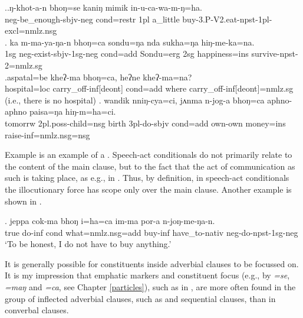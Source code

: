 \ex.\ag.\label{ex-ngkhotan}ŋ-khot-a-n  bhoŋ=se          kaniŋ   mimik    in-u-ca-wa-m-ŋ=ha.\\
{\sc neg-}be\_enough{\sc [3sg]-sbjv-neg} {\sc cond=restr} {\sc 1pl} a\_little buy{\sc -3.P-V2.eat-npst-1pl-excl=nmlz.nsg}\\
 
\bg. ka  m-ma-ya-ŋa-n bhoŋ=ca  sondu=ŋa    nda sukha=ŋa   hiŋ-me-ka=na.\\
{\sc 1sg} {\sc neg-}exist{\sc -sbjv-1sg-neg} {\sc cond=add} Sondu{\sc =erg} {\sc 2sg} happiness{\sc =ins} survive{\sc -npst-2=nmlz.sg}\\
 
\bg.aspatal=be     kheʔ-ma    bhoŋ=ca,       heʔne kheʔ-ma=na?\\
hospital{\sc =loc} carry\_off{\sc -inf[deont]} {\sc cond=add} where carry\_off{\sc -inf[deont]=nmlz.sg} \\
 (i.e., there is no hospital) 
\bg. wandik nniŋ-cya=ci, jʌnma n-jog-a bhoŋ=ca   aphno-aphno paisa=ŋa hiŋ-m=ha=ci.\\
tomorrw {\sc 2pl.poss-}child{\sc =nsg} birth  {\sc 3pl-}do{\sc -sbjv} {\sc cond=add} own-own money{\sc =ins} raise{\sc -inf=nmlz.nsg=nsg}\\
 

Example \Last[c] is an example of a  \citep[267]{Thompsonetal2007_Adverbial}. Speech-act conditionals do not primarily relate to the content of the main clause, but to the fact that the act of communication as such is taking place, as e.g., in . Thus, by definition, in  speech-act conditionals the illocutionary force has scope only over the main clause. Another example is shown in \Next. 

\exg.	jeppa cok-ma  bhoŋ  i=ha=ca  im-ma  por-a  n-joŋ-me-ŋa-n.\\
		true  do{\sc -inf} {\sc cond}  what={\sc nmlz.nsg=add} buy{\sc -inf} have\_to{\sc -nativ} {\sc neg-}do{\sc -npst-1sg-neg}\\
		‘To be honest, I do not have to buy anything.’		

It is generally possible for constituents inside adverbial clauses to be focussed on. It is my impression that emphatic markers and constituent focus (e.g., by \emph{=se}, \emph{=maŋ} and \emph{=ca}, see Chapter \ref{particles}), such as in \Next, are more often found in the group of inflected adverbial clauses, such as  and sequential clauses, than in converbal clauses.


